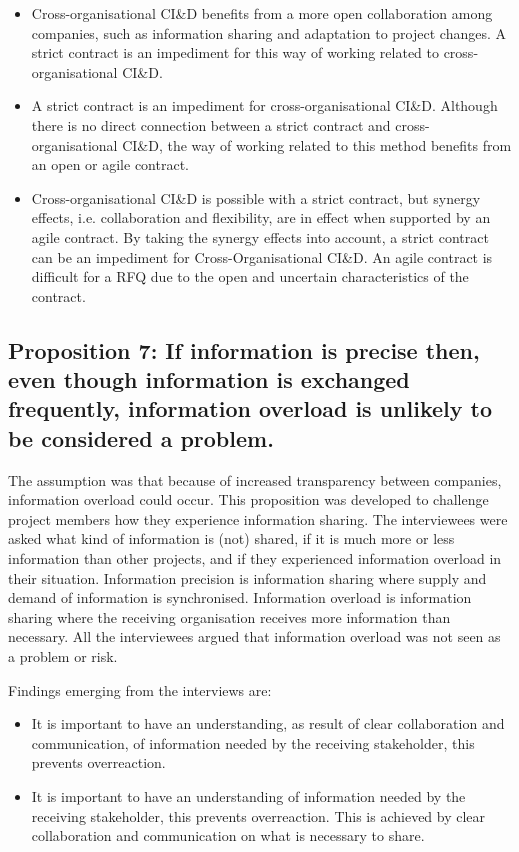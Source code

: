 \begin{itemize}
\item Cross-organisational CI\&D benefits from a more open collaboration among companies, such as information sharing and adaptation to project changes. A strict contract is an impediment for this way of working related to cross-organisational CI\&D.
\item A strict contract is an impediment for cross-organisational CI\&D. Although there is no direct connection between a strict contract and cross-organisational CI\&D, the way of working related to this method benefits from an open or agile contract.
\item Cross-organisational CI\&D is possible with a strict contract, but synergy effects, i.e. collaboration and flexibility, are in effect when supported by an agile contract. By taking the synergy effects into account, a strict contract can be an impediment for Cross-Organisational CI\&D. An agile contract is difficult for a RFQ due to the open and uncertain characteristics of the contract.
\end{itemize}

\subsection{Proposition 7: If information is precise then, even though information is exchanged frequently, information overload is unlikely to be considered a problem.}

The assumption was that because of increased transparency between companies, information overload could occur. This proposition was developed to challenge project members how they experience information sharing. The interviewees were asked what kind of information is (not) shared, if it is much more or less information than other projects, and if they experienced information overload in their situation. Information precision is information sharing where supply and demand of information is synchronised. Information overload is information sharing where the receiving organisation receives more information than necessary. All the interviewees argued that information overload was not seen as a problem or risk.

Findings emerging from the interviews are:


\begin{itemize}
\item It is important to have an understanding, as result of clear collaboration and communication, of information needed by the receiving stakeholder, this prevents overreaction.
\item It is important to have an understanding of information needed by the receiving stakeholder, this prevents overreaction. This is achieved by clear collaboration and communication on what is necessary to share.
\end{itemize}

